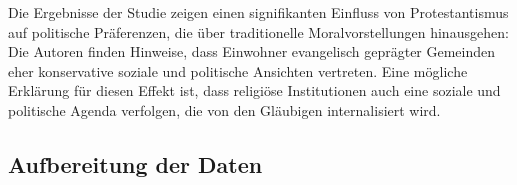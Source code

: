 \documentclass[
  a4paper,
  DIV=11,
  oneside]{scrreprt}
\begin{document}
{
\makeatletter
\def\LT@makecaption#1#2#3{%
  \noalign{\smash{\hbox{\kern\textwidth\rlap{\kern\marginparsep
  \parbox[t]{\marginparwidth}{%
    \footnotesize{%
      \vspace{(1.1\baselineskip)}
    #1{#2: }\ignorespaces #3}}}}}}%
    }
\makeatother

\begin{figure}[t]



\end{figure}%

}

Die Ergebnisse der Studie zeigen einen signifikanten Einfluss von
Protestantismus auf politische Präferenzen, die über traditionelle
Moralvorstellungen hinausgehen: Die Autoren finden Hinweise, dass
Einwohner evangelisch geprägter Gemeinden eher konservative soziale und
politische Ansichten vertreten. Eine mögliche Erklärung für diesen
Effekt ist, dass religiöse Institutionen auch eine soziale und
politische Agenda verfolgen, die von den Gläubigen internalisiert wird.

\subsection{Aufbereitung der Daten}\label{aufbereitung-der-daten}
\end{document}
